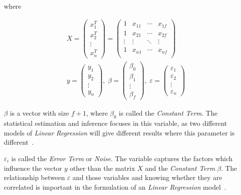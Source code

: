 where

\begin{equation*}
\begin{gathered}
	X = \begin{pmatrix} x_1^T \\ x_2^T \\ \vdots \\ x_n^T \end{pmatrix} =
	\begin{pmatrix}
		1 & x_{1 1} & \cdots & x_{1 f} \\
		1 & x_{2 1} & \cdots & x_{2 f} \\
		\vdots & \vdots & \ddots & \vdots \\
		1 & x_{n 1} & \cdots & x_{n f} \\
	\end{pmatrix} \\
	y = \begin{pmatrix} y_1 \\ y_2 \\ \vdots \\ y_n \end{pmatrix}, \;
	\beta = \begin{pmatrix} \beta_0 \\ \beta_1 \\ \vdots \\ \beta_f \end{pmatrix}, \;
	\varepsilon = \begin{pmatrix} \varepsilon_1 \\ \varepsilon_2 \\ \vdots \\ \varepsilon_n \end{pmatrix}
\end{gathered}
\end{equation*}

$\beta$ is a vector with size $f + 1$, where $\beta_0$ is called the \emph{Constant Term}. The statistical estimation and inference focuses in this variable, as two different models of \emph{Linear Regression} will give different results where this parameter is different~\cite{yan2009linear}.

$\varepsilon_i$ is called the \emph{Error Term} or \emph{Noise}. The variable captures the factors which influence the vector $y$ other than the matrix $X$ and the \emph{Constant Term} $\beta$. The relationship between $\varepsilon$ and those variables and knowing whether they are correlated is important in the formulation of an \emph{Linear Regression} model~\cite{yan2009linear}.

